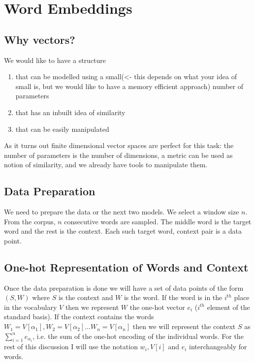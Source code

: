 



\chapter{Word Embeddings}

\section{Why vectors?}
We would like to have a structure 
\begin{enumerate}
    \item that can be modelled using a small(<- this depends on what your idea of small is, but we would like to have a memory efficient approach) number of parameters
    \item that has an inbuilt idea of similarity
    \item that can be easily manipulated
\end{enumerate}
As it turns out finite dimensional vector spaces are perfect for this task: the number of parameters is the number of dimensions, a metric can be used as notion of similarity, and we already have tools to manipulate them.





\section{Data Preparation}
We need to prepare the data or the next two models. We select a window size $n$. From the corpus, $n$ consecutive words are sampled. The middle word is the target word and the rest is the context. Each such target word, context pair is a data point.



\section{One-hot Representation of Words and Context}

Once the data preparation is done we will have a set of data points of the form $(S,W)$ where $S$ is the context and $W$ is the word. If the word is in the $i^{th}$ place in the vocabulary $V$ then we represent $W$ the one-hot vector $e_i$ ($i^{th}$ element of the standard basis). If the context contains the words $W_1=V[\alpha_1], W_2=V[\alpha_2]\hdots W_n=V[\alpha_n]$ then we will represent the context $S$ as $\sum_{i=1}^ne_{\alpha_i}$, i.e. the sum of the one-hot encoding of the individual words. For the rest of this discussion I will use the notation $w_i,V[i]$ and $e_i$ interchangeably for words. 








